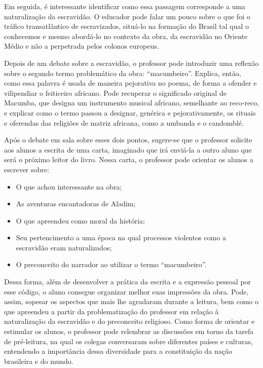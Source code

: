 \documentclass[11pt]{extarticle}
\begin{document}
Em seguida, é interessante identificar como essa passagem corresponde a uma naturalização da escravidão. O educador pode falar um pouco sobre o que foi o tráfico transatlântico de escravizados, situá-lo na formação do Brasil tal qual o conhecemos e mesmo abordá-lo no contexto da obra, da escravidão no Oriente Médio e não a perpetrada pelos colonos europeus.

Depois de um debate sobre a escravidão, o professor pode introduzir uma reflexão sobre o segundo termo problemático da obra: ``macumbeiro''. Explica, então, como essa palavra é usada de maneira pejorativa no poema, de forma a ofender e vilipendiar o feiticeiro africano. Pode recuperar o significado original de Macumba, que designa um instrumento musical africano, semelhante ao reco-reco, e explicar como o termo passou a designar, genérica e pejorativamente, os rituais e oferendas das religiões de matriz africana, como a umbanda e o candomblé.

Após o debate em sala sobre esses dois pontos, sugere-se que o professor solicite aos alunos a escrita de uma carta, imaginado que irá enviá-la a outro aluno que será o próximo leitor do livro.
Nessa carta, o professor pode orientar os alunos a escrever sobre:

\begin{itemize}
\item O que achou interessante na obra;

\item As aventuras encantadoras de Aladim;

\item O que apreendeu como moral da história;

\item Seu pertencimento a uma época na qual processos violentos como a escravidão eram naturalizados;

\item O preconceito do narrador ao utilizar o termo ``macumbeiro''.
\end{itemize}

Dessa forma, além de desenvolver a prática da escrita e a expressão pessoal por esse código, o aluno consegue organizar melhor suas impressões da obra. Pode, assim, sopesar os aspectos que mais lhe agradaram durante a leitura, bem como o que apreendeu a partir da problematização do professor em relação à naturalização da escravidão e do preconceito religioso. Como forma de orientar e estimular os alunos, o professor pode relembrar as discussões em torno da tarefa de pré-leitura, na qual os colegas conversaram sobre diferentes países e culturas, entendendo a importância dessa diversidade para a constituição da nação brasileira e do mundo.
\end{document}
